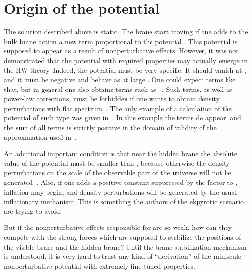 \documentclass[a4paper,12pt]{article}
\begin{document}
\section{Origin of the potential \coordHE{}}

The solution described above is static. The brane start moving if  one adds to the bulk brane action a new term proportional to the potential \coordHE{}. This potential is supposed to appear as a result of nonperturbative effects. However, it was not demonstrated that the potential with required properties may actually emerge in the HW theory. Indeed, the potential \coordHE{} must be very specific. It should vanish at \coordHE{}, and it must be negative and behave as \coordHE{} at large \coordHE{}. One could expect terms like that, but in general one also obtains terms such as \coordHE{}~\cite{Moore:2000fs}. Such terms, as well as power-law corrections, must be forbidden if one wants to obtain density perturbations with flat spectrum~\cite{KKL}. The only example of a calculation of the potential of such type was given in~\cite{Moore:2000fs}. In this example the terms \coordHE{} do appear, and the sum of all terms is strictly positive in the domain of validity of the approximation used in~\cite{Moore:2000fs}.

An additional important condition is that near the hidden brane the absolute value of the potential must be smaller than \coordHE{}, because otherwise the density perturbations on the scale of the observable part of the universe will not be generated~\cite{KKL}. Also, if one adds a positive constant suppressed by the factor \coordHE{} to \coordHE{}, inflation may begin, and density perturbations will be generated by the usual inflationary mechanism. This is something the authors of the ekpyrotic scenario are trying to avoid.

But if the nonperturbative effects responsible for \coordHE{} are so weak, how can they compete with the strong forces which are supposed to stabilize the positions of the visible brane and the hidden brane? Until the brane stabilization mechanism is understood, it is very hard to trust any kind of ``derivation'' of the miniscule nonperturbative potential \coordHE{} with extremely fine-tuned properties.
\end{document}
